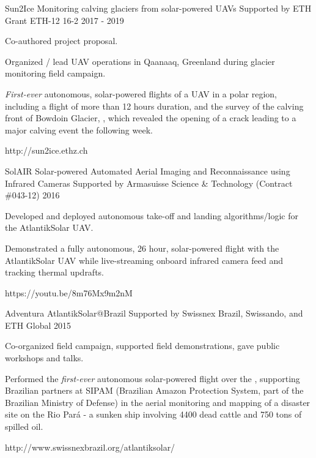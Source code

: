 \begin{cventries}
  \cvprojwideentry
  	{Sun2Ice} %
  	{Monitoring calving glaciers from solar-powered UAVs} %
    {Supported by ETH Grant ETH-12 16-2} %
    {2017 - 2019} %
    {
      \begin{cvitems} %
        \item {Co-authored project proposal.}
        \item {Organized / lead UAV operations in Qaanaaq, Greenland during glacier monitoring field campaign.}
        \item {\emph{First-ever} autonomous, solar-powered flights of a UAV in a polar region, including a flight of more than 12 hours duration, and the survey of the calving front of Bowdoin Glacier, , which revealed the opening of a crack leading to a major calving event the following week.}
      \end{cvitems}
    } %
    {http://sun2ice.ethz.ch} %
    {\showprojectdescriptions}
    
\cvprojwideentry
  	{SolAIR} %
  	{Solar-powered Automated Aerial Imaging and Reconnaissance using Infrared Cameras} %
    {Supported by Armasuisse Science \& Technology (Contract \#043-12)} %
    {2016} %
    {
      \begin{cvitems} %
        \item {Developed and deployed autonomous take-off and landing algorithms/logic for the AtlantikSolar UAV.}
        \item {Demonstrated a fully autonomous, 26 hour, solar-powered flight with the AtlantikSolar UAV while live-streaming onboard infrared camera feed and tracking thermal updrafts.}
      \end{cvitems}
    } %
    {https://youtu.be/8m76Mx9m2nM} %
    {\showprojectdescriptions}
    
\cvprojwideentry
  	{Adventura AtlantikSolar@Brazil} %
  	{} %
    {Supported by Swissnex Brazil, Swissando, and ETH Global} %
    {2015} %
    {
      \begin{cvitems} %
        \item {Co-organized field campaign, supported field demonstrations, gave public workshops and talks.}
        \item {Performed the \emph{first-ever} autonomous solar-powered flight over the , supporting Brazilian partners at SIPAM (Brazilian Amazon Protection System, part of the Brazilian Ministry of Defense) in the aerial monitoring and mapping of a disaster site on the Rio Pará - a sunken ship involving 4400 dead cattle and 750 tons of spilled oil.}
      \end{cvitems}
    } %
    {http://www.swissnexbrazil.org/atlantiksolar/} %
    {\showprojectdescriptions}


\end{cventries}
